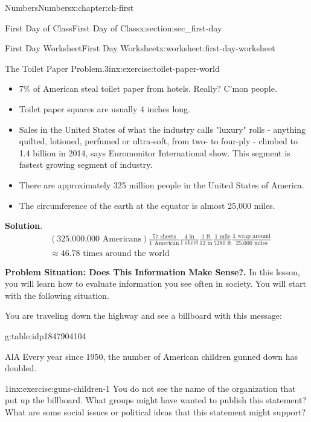 \documentclass[twoside,10pt,]{book}
\newcommand{\blocktitlefont}{\relax}
\newcommand{\tabularfont}{\relax}
\numberwithin{equation}{chapter}
\newcommand{\hrulethin}  {\noalign{\hrule height 0.04em}}
\newcommand{\amp}{&}
\begin{document}
\begin{chapterptx}{Numbers}{}{Numbers}{}{}{x:chapter:ch-first}
\begin{sectionptx}{First Day of Class}{}{First Day of Class}{}{}{x:section:sec_first-day}
\begin{worksheet-subsection}{First Day Worksheet}{}{First Day Worksheet}{}{}{x:worksheet:first-day-worksheet}
\begin{divisionexercise}{11}{The Toilet Paper Problem.}{3in}{x:exercise:toilet-paper-world}
\begin{itemize}[label=\textbullet]
\item{}7\% of American steal toilet paper from hotels. Really? C'mon people.%
\item{}Toilet paper squares are usually 4 inches long.%
\item{}Sales in the United States of what the industry calls "luxury" rolls - anything quilted, lotioned, perfumed or ultra-soft, from two- to four-ply - climbed to \textdollar{}1.4 billion in 2014, says Euromonitor International show. This segment is fastest growing segment of industry.%
\item{}There are approximately 325 million people in the United States of America.%
\item{}The circumference of the earth at the equator is almost 25,000 miles.%
\end{itemize}
\par\smallskip%
\noindent\textbf{\blocktitlefont Solution}.\hypertarget{g:solution:idp1847890664}{}\quad{}%
\begin{align*}
\amp(\text{325,000,000 Americans})\frac{57 \text{ sheets}}{1 \text{ American}} \frac{4 \text{ in}}{1 \text{ sheet}} \frac{1 \text{ ft}}{12 \text{ in}} \frac{1 \text{ mile}}{5280 \text{ ft}} \frac{1 \text{ wrap around}}{\text{25,000 miles}}\\
\amp \approx 46.78 \text{ times around the world}
\end{align*}
%
\end{divisionexercise}%
\clearpage
\par\medskip\noindent%
\textbf{Problem Situation: Does This Information Make Sense?.}\space\space%
In this lesson, you will learn how to evaluate information you see often in society. You will start with the following situation.%
\par
You are traveling down the highway and see a billboard with this message:%
\begin{tableptx}{\textbf{}}{g:table:idp1847904104}{}%
\centering%
{\tabularfont%
\begin{tabular}{AlA}\hrulethin
Every year since 1950, the number of American children gunned down has doubled.\tabularnewline\hrulethin
\end{tabular}
}%
\end{tableptx}%
\begin{exercisegroup}
\begin{divisionexerciseeg}{12}{}{1in}{x:exercise:guns-children-1}%
You do not see the name of the organization that put up the billboard. What groups might have wanted to publish this statement? What are some social issues or political ideas that this statement might support?%

\end{divisionexerciseeg}
\end{exercisegroup}
\end{worksheet-subsection}
\end{sectionptx}
\end{chapterptx}
\end{document}
